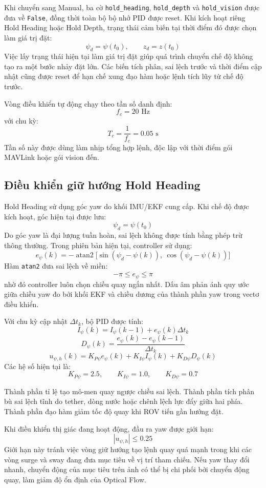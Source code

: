 \documentclass[../DoAn.tex]{subfiles}
\begin{document}
Khi chuyển sang Manual, ba cờ \texttt{hold\_heading}, \texttt{hold\_depth} và \texttt{hold\_vision} được đưa về \texttt{False}, đồng thời toàn bộ bộ nhớ PID được reset. Khi kích hoạt riêng Hold Heading hoặc Hold Depth, trạng thái cảm biến tại thời điểm đó được chọn làm giá trị đặt:
\[
\psi_d = \psi(t_0), \qquad z_d = z(t_0)
\]
Việc lấy trạng thái hiện tại làm giá trị đặt giúp quá trình chuyển chế độ không tạo ra một bước nhảy đặt lớn. Các biến tích phân, sai lệch trước và thời điểm cập nhật cũng được reset để hạn chế xung đạo hàm hoặc lệnh tích lũy từ chế độ trước.

Vòng điều khiển tự động chạy theo tần số danh định:
\[
f_c = 20\text{ Hz}
\]
với chu kỳ:
\[
T_c = \frac{1}{f_c} = 0.05\text{ s}
\]
Tần số này được dùng làm nhịp tổng hợp lệnh, độc lập với thời điểm gói MAVLink hoặc gói vision đến.

\subsection{Điều khiển giữ hướng Hold Heading}

Hold Heading sử dụng góc yaw do khối IMU/EKF cung cấp. Khi chế độ được kích hoạt, góc hiện tại được lưu:
\[
\psi_d = \psi(t_0)
\]
Do góc yaw là đại lượng tuần hoàn, sai lệch không được tính bằng phép trừ thông thường. Trong phiên bản hiện tại, controller sử dụng:
\[
e_\psi(k) = -\operatorname{atan2} \Big[ \sin\left(\psi_d-\psi(k)\right),\ \cos\left(\psi_d-\psi(k)\right) \Big]
\]
Hàm \texttt{atan2} đưa sai lệch về miền:
\[
-\pi \leq e_\psi \leq \pi
\]
nhờ đó controller luôn chọn chiều quay ngắn nhất. Dấu âm phản ánh quy ước giữa chiều yaw đo bởi khối EKF và chiều dương của thành phần yaw trong vectơ điều khiển.

Với chu kỳ cập nhật $\Delta t_k$, bộ PID được tính:
\[
I_\psi(k) = I_\psi(k-1) + e_\psi(k)\Delta t_k
\]
\[
D_\psi(k) = \frac{e_\psi(k)-e_\psi(k-1)}{\Delta t_k}
\]
\[
u_{\psi,h}(k) = K_{P\psi}e_\psi(k) + K_{I\psi}I_\psi(k) + K_{D\psi}D_\psi(k)
\]
Các hệ số hiện tại là:
\[
K_{P\psi} = 2.5, \qquad K_{I\psi} = 1.0, \qquad K_{D\psi} = 0.7
\]

Thành phần tỉ lệ tạo mô-men quay ngược chiều sai lệch. Thành phần tích phân bù sai lệch tĩnh do tether, dòng nước hoặc chênh lệch lực đẩy giữa hai phía. Thành phần đạo hàm giảm tốc độ quay khi ROV tiến gần hướng đặt.

Khi điều khiển thị giác đang hoạt động, đầu ra yaw được giới hạn:
\[
|u_{\psi,h}| \leq 0.25
\]
Giới hạn này tránh việc vòng giữ hướng tạo lệnh quay quá mạnh trong khi các vòng surge và sway đang đưa mục tiêu về vị trí tham chiếu. Nếu yaw thay đổi nhanh, chuyển động của mục tiêu trên ảnh có thể bị chi phối bởi chuyển động quay, làm giảm độ ổn định của Optical Flow.
\end{document}
